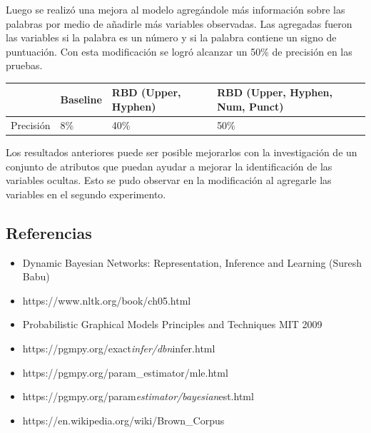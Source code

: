 \documentclass[]{article}
\begin{document}
Luego se realizó una mejora al modelo agregándole más información sobre
las palabras por medio de añadirle más variables observadas. Las
agregadas fueron las variables si la palabra es un número y si la
palabra contiene un signo de puntuación. Con esta modificación se logró
alcanzar un 50\% de precisión en las pruebas.

\begin{longtable}[]{@{}llll@{}}
\toprule
& Baseline & RBD (Upper, Hyphen) & RBD (Upper, Hyphen, Num,
Punct)\tabularnewline
\midrule
\endhead
Precisión & 8\% & 40\% & 50\%\tabularnewline
\bottomrule
\end{longtable}

Los resultados anteriores puede ser posible mejorarlos con la
investigación de un conjunto de atributos que puedan ayudar a mejorar la
identificación de las variables ocultas. Esto se pudo observar en la
modificación al agregarle las variables en el segundo experimento.

\subsection{Referencias}\label{header-n163}

\begin{itemize}
\item
  Dynamic Bayesian Networks: Representation, Inference and Learning
  (Suresh Babu)
\item
  https://www.nltk.org/book/ch05.html
\item
  Probabilistic Graphical Models Principles and Techniques MIT 2009
\item
  https://pgmpy.org/exact\emph{infer/dbn}infer.html
\item
  https://pgmpy.org/param\_estimator/mle.html
\item
  https://pgmpy.org/param\emph{estimator/bayesian}est.html
\item
  https://en.wikipedia.org/wiki/Brown\_Corpus
\end{itemize}
\end{document}
